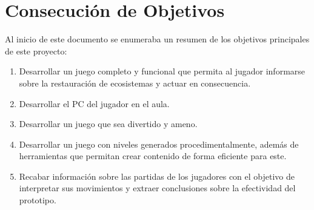 \section{Consecución de Objetivos}

Al inicio de este documento se enumeraba un resumen de los objetivos principales de este proyecto:
\begin{enumerate}[itemsep=0mm]
    \item Desarrollar un juego completo y funcional que permita al jugador informarse sobre la restauración de ecosistemas y actuar en consecuencia.
    \item Desarrollar el PC del jugador en el aula.
    \item Desarrollar un juego que sea divertido y ameno.
    \item Desarrollar un juego con niveles generados procedimentalmente, además de herramientas que permitan crear contenido de forma eficiente para este.
    \item Recabar información sobre las partidas de los jugadores con el objetivo de interpretar sus movimientos y extraer conclusiones sobre la efectividad del prototipo.
\end{enumerate}

